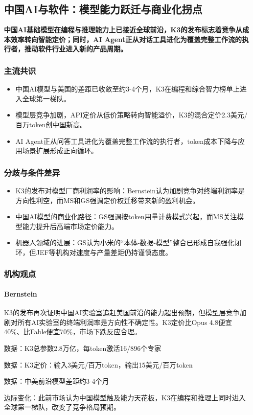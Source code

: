 \documentclass[11pt]{ctexart}
\begin{document}
\subsection{中国AI与软件：模型能力跃迁与商业化拐点}
\textbf{中国AI基础模型在编程与推理能力上已接近全球前沿，K3的发布标志着竞争从成本效率转向智能定价；同时，AI Agent正从对话工具进化为覆盖完整工作流的执行者，推动软件行业进入新的产品周期。}
\subsubsection*{主流共识}
\begin{itemize}
  \item 中国AI模型与美国的差距已收敛至约3-4个月，K3在编程和综合智力榜单上进入全球第一梯队。
  \item 模型层竞争加剧，API定价从低价策略转向智能溢价，K3的混合定价2.3美元/百万token创中国新高。
  \item AI Agent正从问答工具进化为覆盖完整工作流的执行者，token成本下降与应用场景扩展形成正向循环。
\end{itemize}
\subsubsection*{分歧与条件差异}
\begin{itemize}
  \item K3的发布对模型厂商利润率的影响：Bernstein认为加剧竞争对终端利润率是方向性利空，而MS和GS强调定价权迁移带来新的盈利机会。
  \item 中国AI模型的商业化路径：GS强调按token用量计费模式兴起，而MS关注模型能力提升后高端市场定价能力。
  \item 机器人领域的进展：GS认为小米的“本体-数据-模型”整合已形成自我强化闭环，但JEF等机构对速度与产量差距仍持谨慎态度。
\end{itemize}
\subsubsection*{机构观点}
\paragraph{Bernstein} K3的发布再次证明中国AI实验室追赶美国前沿的能力超出预期，但模型层竞争加剧对所有AI实验室的终端利润率是方向性不确定性。K3定价比Opus 4.8便宜40\%、比Fable便宜70\%，市场下跌反应合理。
{\small\color{refgray}数据：K3总参数2.8万亿，每token激活16/896个专家\par}
{\small\color{refgray}数据：K3定价：输入3美元/百万token，输出15美元/百万token\par}
{\small\color{refgray}数据：中美前沿模型差距约3-4个月\par}
{\small\color{refgray}边际变化：此前市场认为中国模型触及能力天花板，K3在编程和推理上同时进入全球第一梯队，改变了竞争格局预期。\par}
\end{document}

